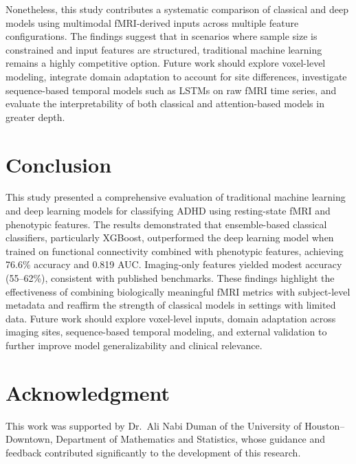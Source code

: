 \documentclass[conference]{IEEEtran}
\begin{document}
Nonetheless, this study contributes a systematic comparison of classical and deep models using multimodal fMRI-derived inputs across multiple feature configurations. The findings suggest that in scenarios where sample size is constrained and input features are structured, traditional machine learning remains a highly competitive option. Future work should explore voxel-level modeling, integrate domain adaptation to account for site differences, investigate sequence-based temporal models such as LSTMs on raw fMRI time series, and evaluate the interpretability of both classical and attention-based models in greater depth.

\section{Conclusion}
This study presented a comprehensive evaluation of traditional machine learning and deep learning models for classifying ADHD using resting-state fMRI and phenotypic features. The results demonstrated that ensemble-based classical classifiers, particularly XGBoost, outperformed the deep learning model when trained on functional connectivity combined with phenotypic features, achieving 76.6\% accuracy and 0.819 AUC. Imaging-only features yielded modest accuracy (55--62\%), consistent with published benchmarks. These findings highlight the effectiveness of combining biologically meaningful fMRI metrics with subject-level metadata and reaffirm the strength of classical models in settings with limited data. Future work should explore voxel-level inputs, domain adaptation across imaging sites, sequence-based temporal modeling, and external validation to further improve model generalizability and clinical relevance.

\section*{Acknowledgment}
This work was supported by Dr.\ Ali Nabi Duman of the University of Houston--Downtown, Department of Mathematics and Statistics, whose guidance and feedback contributed significantly to the development of this research.
\end{document}
